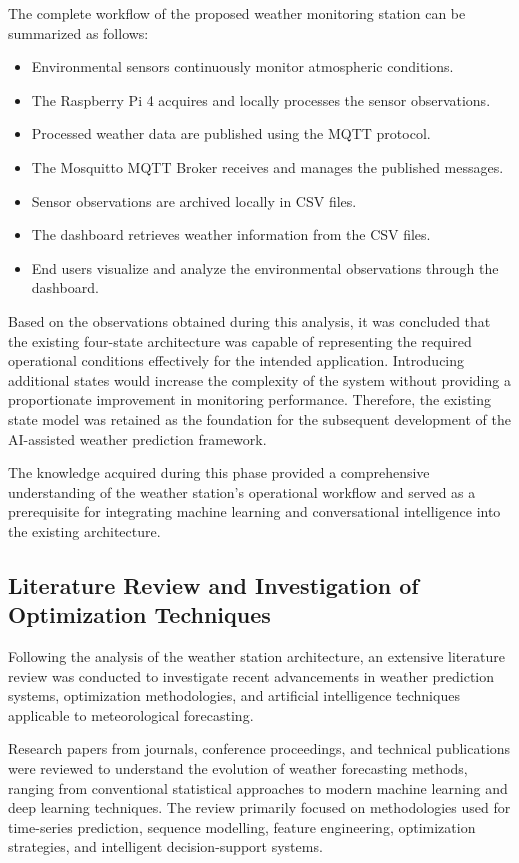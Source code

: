 \documentclass[12pt]{article}
\begin{document}
The complete workflow of the proposed weather monitoring station can be summarized as follows:
\begin{itemize}
    \item Environmental sensors continuously monitor atmospheric conditions.
    \item The Raspberry Pi 4 acquires and locally processes the sensor observations.
    \item Processed weather data are published using the MQTT protocol.
    \item The Mosquitto MQTT Broker receives and manages the published messages.
    \item Sensor observations are archived locally in CSV files.
    \item The dashboard retrieves weather information from the CSV files.
    \item End users visualize and analyze the environmental observations through the dashboard.
\end{itemize}

Based on the observations obtained during this analysis, it was concluded that the existing four-state architecture was capable of representing the required operational conditions effectively for the intended application. Introducing additional states would increase the complexity of the system without providing a proportionate improvement in monitoring performance. Therefore, the existing state model was retained as the foundation for the subsequent development of the AI-assisted weather prediction framework.

The knowledge acquired during this phase provided a comprehensive understanding of the weather station’s operational workflow and served as a prerequisite for integrating machine learning and conversational intelligence into the existing architecture.

\subsection{Literature Review and Investigation of Optimization Techniques}
Following the analysis of the weather station architecture, an extensive literature review was conducted to investigate recent advancements in weather prediction systems, optimization methodologies, and artificial intelligence techniques applicable to meteorological forecasting.

Research papers from journals, conference proceedings, and technical publications were reviewed to understand the evolution of weather forecasting methods, ranging from conventional statistical approaches to modern machine learning and deep learning techniques. The review primarily focused on methodologies used for time-series prediction, sequence modelling, feature engineering, optimization strategies, and intelligent decision-support systems.
\end{document}
